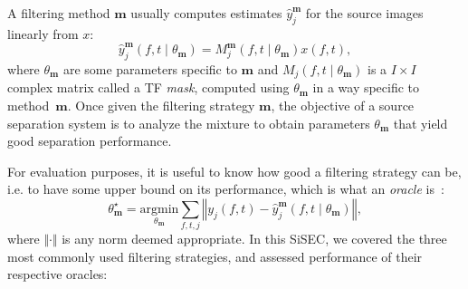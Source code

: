 \documentclass{llncs}
\newcommand{\sboxed}[1]{\textbf{#1}}
\newcommand{\thet}[1]{\theta_{\sboxed{#1}}}
\newcommand{\ft}{\left(f,t\right)}
\newcommand{\ftt}[1]{\left(f,t\mid\thet{#1}\right)}
\begin{document}
A filtering method $\sboxed{m}$ usually computes estimates $\hat{y}_j^{\sboxed{m}}$ for the source images linearly from $x$:
\begin{equation}
  \hat{y}_j^{\sboxed{m}}\ftt{m}=M_j^{\sboxed{m}}\ftt{m} x\ft,\label{eq:TFmask}
\end{equation}
where $\thet{m}$ are some parameters specific to $\sboxed{m}$ and $M_j\ftt{m}$ is a $I\times I$ complex matrix called a TF \textit{mask}, computed using $\thet{m}$ in a way specific to method~$\sboxed{m}$. Once given the filtering strategy $\sboxed{m}$, the objective of a source separation system is to analyze the mixture to obtain parameters $\thet{m}$ that yield good separation performance.

For evaluation purposes, it is useful to know how good a filtering strategy can be, i.e. to have some upper bound on its performance, which is what an \textit{oracle} is~\cite{vincent2007oracle}:
\begin{equation}
  \thet{m}^{\star}=\underset{\thet{m}}{\text{argmin}}\sum_{f,t,j}\left\Vert y_{j}\ft-\hat{y}_{j}^{\sboxed{m}}\ftt{m}\right\Vert,
  \end{equation}
where $\Vert\cdot\Vert$ is any norm deemed appropriate. In this SiSEC, we covered the three most commonly used filtering strategies, and assessed performance of their respective oracles:
\end{document}
